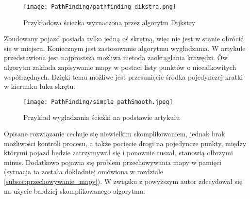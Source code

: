         \begin{figure}[!ht]
            \centering
            \texttt{[image: PathFinding/pathfinding\_dikstra.png]}
            \caption{Przykładowa ścieżka wyznaczona przez algorytm Dijkstry}
            \label{fig:pathfinding_dikstra}
        \end{figure}

        Zbudowany pojazd posiada tylko jedną oś skrętną, więc nie jest w stanie obrócić się w miejscu.
        Koniecznym jest zastosowanie algorytmu wygładzania.
        W artykule  \cite{Simple_PathSmoothing} przedstawiona jest najprostsza możliwa metoda zaokrąglania krawędzi.
        Ów algorytm zakłada zapisywanie mapy w postaci listy punktów o niecałkowitych współrzędnych.
        Dzięki temu możliwe jest przesunięcie środka pojedynczej kratki w kierunku łuku skrętu.

        \begin{figure}[!ht]
            \centering
            \texttt{[image: PathFinding/simple\_pathSmooth.jpeg]}
            \caption{Przykład wygładzania ścieżki na podstawie artykułu}
             \cite{Simple_PathSmoothing}
            \label{fig:simple_pathSmooth}
        \end{figure}

        Opisane rozwiązanie cechuje się niewielkim skomplikowaniem, jednak
        brak możliwości kontroli procesu, a także pocięcie drogi na pojedyncze punkty, między którymi pojazd będzie zatrzymywał się i ponownie ruszał, stanowią olbrzymi minus.
        Dodatkowo pojawia się problem przechowywania mapy w pamięci (sytuacja ta została dokładniej omówiona w rozdziale \ref{subsec:przechowywanie_mapy}).
        W związku z powyższym autor zdecydował się na użycie bardziej skomplikowanego algorytmu.

